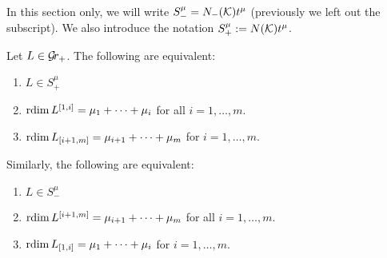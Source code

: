 \documentclass{article} %
\begin{document}
In this section only, we will write $ S^\mu_- = N_-(\mathcal K) t^\mu$ (previously we left out the subscript). We also introduce the notation $S^\mu_+ := N(\mathcal K)t^\mu$. 
% 

\begin{lemma} \label{le:Srdim}
    Let $ L \in \mathcal{G}\!r_+$.  The following are equivalent:
    \begin{enumerate}
        \item $ L \in S_+^\mu$ \label{Srdim1}
        \item $ \operatorname{rdim} L^{[1,i]} = \mu_1 + \dots + \mu_i$ for all $ i = 1, \dots, m $. \label{Srdim2} %
        \item $ \operatorname{rdim} L_{[i+1,m]} = \mu_{i+1} + \dots + \mu_m$ for $ i  = 1, \dots, m$. \label{Srdim3} %
    \end{enumerate}
    Similarly, the following are equivalent:
        \begin{enumerate}[label=\arabic*'.]
        \item $ L \in S_-^\mu$
        \item $ \operatorname{rdim} L^{[i+1,m]} = \mu_{i+1} + \dots + \mu_m$ for all $ i = 1, \dots, m $.
        \item $ \operatorname{rdim} L_{[1,i]} = \mu_{1} + \dots + \mu_i$ for $ i  = 1, \dots, m$.
    \end{enumerate}
\end{lemma}
\end{document}
